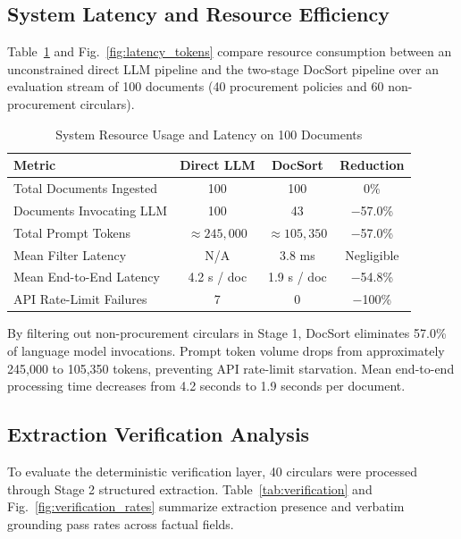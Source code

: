 \documentclass[conference]{IEEEtran}
\begin{document}
\subsection{System Latency and Resource Efficiency}
Table~\ref{tab:system_savings} and Fig.~\ref{fig:latency_tokens} compare resource consumption between an unconstrained direct LLM pipeline and the two-stage DocSort pipeline over an evaluation stream of 100 documents (40 procurement policies and 60 non-procurement circulars).

\begin{table}[t]
\centering
\caption{System Resource Usage and Latency on 100 Documents}
\label{tab:system_savings}
\renewcommand{\arraystretch}{1.2}
\begin{tabularx}{\columnwidth}{lccc}
\toprule
\textbf{Metric} & \textbf{Direct LLM} & \textbf{DocSort} & \textbf{Reduction} \\
\midrule
Total Documents Ingested & 100 & 100 & 0\% \\
Documents Invocating LLM & 100 & 43 & $-$57.0\% \\
Total Prompt Tokens & $\approx 245{,}000$ & $\approx 105{,}350$ & $-$57.0\% \\
Mean Filter Latency & N/A & 3.8 ms & Negligible \\
Mean End-to-End Latency & 4.2 s / doc & 1.9 s / doc & $-$54.8\% \\
API Rate-Limit Failures & 7 & 0 & $-$100\% \\
\bottomrule
\end{tabularx}
\end{table}

By filtering out non-procurement circulars in Stage 1, DocSort eliminates 57.0\% of language model invocations. Prompt token volume drops from approximately 245,000 to 105,350 tokens, preventing API rate-limit starvation. Mean end-to-end processing time decreases from 4.2 seconds to 1.9 seconds per document.

\subsection{Extraction Verification Analysis}
To evaluate the deterministic verification layer, 40 circulars were processed through Stage 2 structured extraction. Table~\ref{tab:verification} and Fig.~\ref{fig:verification_rates} summarize extraction presence and verbatim grounding pass rates across factual fields.
\end{document}
